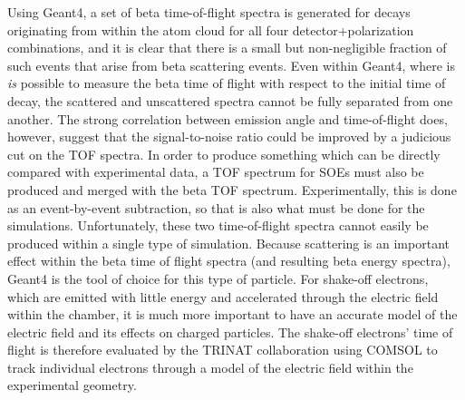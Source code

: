 Using Geant4, a set of beta time-of-flight spectra is generated for decays originating from within the atom cloud for all four detector+polarization combinations, and it is clear that there is a small but non-negligible fraction of such events that arise from beta scattering events.
Even within Geant4, where is \emph{is} possible to measure the beta time of flight with respect to the initial time of decay, the scattered and unscattered spectra cannot be fully separated from one another.  The strong correlation between emission angle and time-of-flight does, however, suggest that the signal-to-noise ratio could be improved by a judicious cut on the TOF spectra. 
%
In order to produce something which can be directly compared with experimental data, a TOF spectrum for SOEs must also be produced and merged with the beta TOF spectrum.  Experimentally, this is done as an event-by-event subtraction, so that is also what must be done for the simulations.  Unfortunately, these two time-of-flight spectra cannot easily be produced within a single type of simulation.  Because scattering is an important effect within the beta time of flight spectra (and resulting beta energy spectra), Geant4 is the tool of choice for this type of particle.  For shake-off electrons, which are emitted with little energy and accelerated through the electric field within the chamber, it is much more important to have an accurate model of the electric field and its effects on charged particles.  The shake-off electrons' time of flight is therefore evaluated by the TRINAT collaboration using COMSOL to track individual electrons through a model of the electric field within the experimental geometry.   

